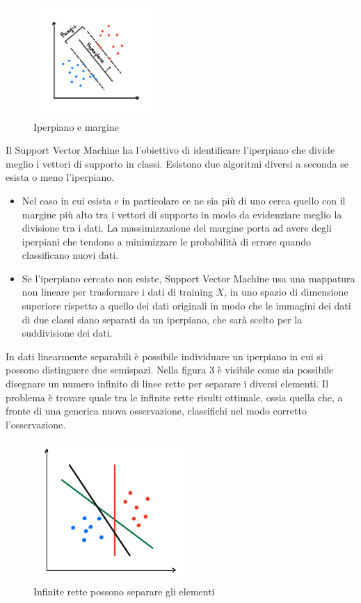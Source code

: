 \documentclass[12pt,italian]{report}
\begin{document}
\begin{figure}[h]
	\centering
	\includegraphics[width = 47mm]{immagini/marginEhiperplane}
	\caption{Iperpiano e margine}
\end{figure}

Il Support Vector Machine ha l'obiettivo di identificare l'iperpiano che divide meglio i vettori di supporto in classi. Esistono due algoritmi diversi a seconda se esista o meno l'iperpiano.

\begin{itemize}
	\item Nel caso in cui esista e in particolare ce ne sia più di uno cerca quello con il margine più alto tra i vettori di supporto in modo da evidenziare meglio la divisione tra i dati. La massimizzazione del margine porta ad avere degli iperpiani che tendono a minimizzare le probabilità di errore quando classificano nuovi dati. 
	\item Se l'iperpiano cercato non esiste, Support Vector Machine usa una mappatura non lineare per trasformare i dati di training $X$, in uno spazio di dimensione superiore rispetto a quello dei dati originali in modo che le immagini dei dati di due classi siano separati da un iperpiano, che sarà scelto per la suddivisione dei dati. 
\end{itemize}

In dati linearmente separabili è possibile individuare un iperpiano in cui si possono distinguere due semispazi. Nella figura 3 è visibile come sia possibile disegnare un numero infinito di linee rette per separare i diversi elementi. Il problema è trovare quale tra le infinite rette risulti ottimale, ossia quella che, a fronte di una generica nuova osservazione, classifichi nel modo corretto l'osservazione.

\begin{figure}[h]
	\centering
	\includegraphics[width = 60mm]{immagini/linearmente-separabili}
	\caption{Infinite rette possono separare gli elementi}
\end{figure}
\end{document}
